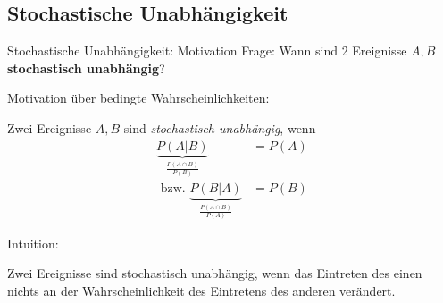 \documentclass[
  10pt,
  ignorenonframetext,
]{beamer}
\begin{document}
\subsection{Stochastische
Unabhängigkeit}\label{stochastische-unabhuxe4ngigkeit}

\begin{frame}{Stochastische Unabhängigkeit: Motivation}
\label{stochastische-unabhuxe4ngigkeit-motivation}
Frage: Wann sind 2 Ereignisse \(A, B\) \textbf{stochastisch unabhängig}?
~

Motivation über bedingte Wahrscheinlichkeiten:

Zwei Ereignisse \(A, B\) sind \emph{stochastisch unabhängig}, wenn
\begin{align*}
\underbrace{P(A|B)}_{\frac{P(A \cap B)}{P(B)}} & =   P(A)\\
\mbox{ bzw. } \underbrace{P(B|A)}_{\frac{P(A \cap B)}{P(A)}} & =   P(B)
\end{align*}

Intuition:

Zwei Ereignisse sind stochastisch unabhängig, wenn das Eintreten des
einen nichts an der Wahrscheinlichkeit des Eintretens des anderen
verändert.
\end{frame}
\end{document}
